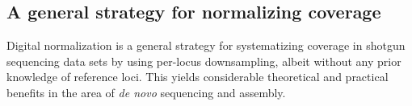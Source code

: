 \documentclass{pnastwo}
\begin{document}
\begin{article}





\subsection{A general strategy for normalizing coverage}

Digital normalization is a general strategy for systematizing coverage
in shotgun sequencing data sets by using per-locus downsampling,
albeit without any prior knowledge of reference loci.  This yields
considerable theoretical and practical benefits in the area of {\em de
  novo} sequencing and assembly.


\end{article}
\end{document}
